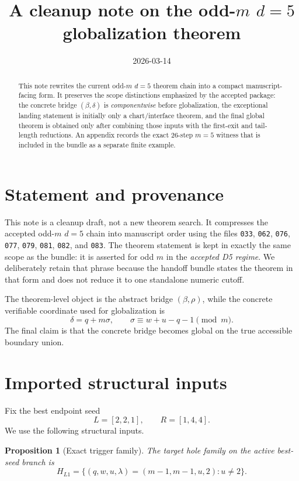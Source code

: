 \documentclass[11pt]{article}
\title{A cleanup note on the odd-$m$ $d=5$ globalization theorem}
\author{}
\date{2026-03-14}
\newtheorem{proposition}[theorem]{Proposition}
\begin{document}
\maketitle

\begin{abstract}
This note rewrites the current odd-$m$ $d=5$ theorem chain into a compact
manuscript-facing form. It preserves the scope distinctions emphasized by the
accepted package: the concrete bridge $(\beta,\delta)$ is \emph{componentwise}
before globalization, the exceptional landing statement is initially only a
chart/interface theorem, and the final global theorem is obtained only after
combining those inputs with the first-exit and tail-length reductions. An
appendix records the exact 26-step $m=5$ witness that is included in the bundle
as a separate finite example.
\end{abstract}

\section{Statement and provenance}

This note is a cleanup draft, not a new theorem search. It compresses the
accepted odd-$m$ $d=5$ chain into manuscript order using the files
\texttt{033}, \texttt{062}, \texttt{076}, \texttt{077}, \texttt{079},
\texttt{081}, \texttt{082}, and \texttt{083}. The theorem statement is kept in
exactly the same scope as the bundle: it is asserted for odd $m$ in the
\emph{accepted D5 regime}. We deliberately retain that phrase because the
handoff bundle states the theorem in that form and does not reduce it to one
standalone numeric cutoff.

The theorem-level object is the abstract bridge $(\beta,\rho)$, while the
concrete verifiable coordinate used for globalization is
\[
\delta = q + m\sigma,
\qquad
\sigma \equiv w + u - q - 1 \pmod m.
\]
The final claim is that the concrete bridge becomes global on the true
accessible boundary union.

\section{Imported structural inputs}

Fix the best endpoint seed
\[
L=[2,2,1],\qquad R=[1,4,4].
\]
We use the following structural inputs.

\begin{proposition}[Exact trigger family]
The target hole family on the active best-seed branch is
\[
H_{L1}=\{(q,w,u,\lambda)=(m-1,m-1,u,2):u\neq 2\}.
\]
\end{proposition}
\end{document}
